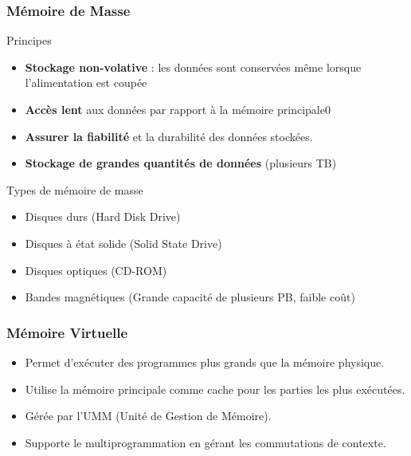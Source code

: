 \documentclass[10pt]{beamer}
\begin{document}
\begin{frame}
    \frametitle{Mémoire de Masse}
    \begin{block}{Principes}
        \begin{itemize}
            \item \textbf{Stockage non-volative} : les données sont conservées
                  même lorsque l'alimentation est coupée
            \item \textbf{Accès lent} aux données par rapport à la mémoire
                  principale0
            \item \textbf{Assurer la fiabilité} et la durabilité des données
                  stockées.
            \item \textbf{Stockage de grandes quantités de données} (plusieurs
                  TB)

        \end{itemize}
    \end{block}
    \begin{exampleblock}{Types de mémoire de masse}
        \begin{itemize}
            \item Disques durs (Hard Disk Drive)
            \item Disques à état solide (Solid State Drive)
            \item Disques optiques (CD-ROM)
            \item Bandes magnétiques (Grande capacité de plusieurs PB, faible
                  coût)
        \end{itemize}
    \end{exampleblock}
\end{frame}

\begin{frame}
    \frametitle{Mémoire Virtuelle}
    \begin{itemize}
        \item Permet d'exécuter des programmes plus grands que la mémoire
              physique.
        \item Utilise la mémoire principale comme cache pour les parties les
              plus exécutées.
        \item Gérée par l'UMM (Unité de Gestion de Mémoire).
        \item Supporte le multiprogrammation en gérant les commutations de
              contexte.
    \end{itemize}
\end{frame}
\end{document}
